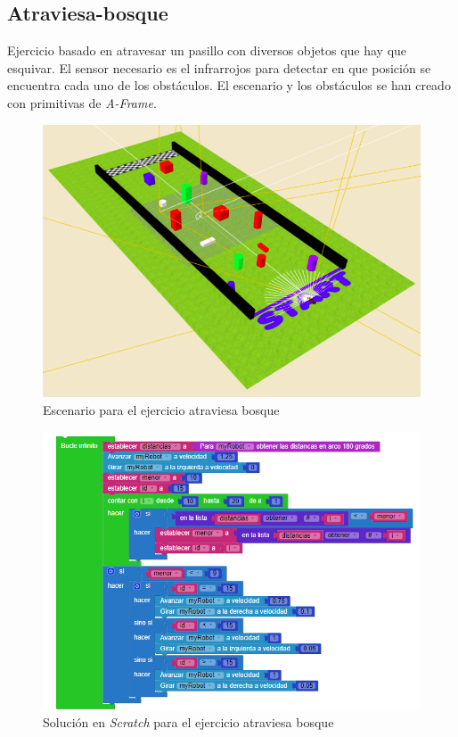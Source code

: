 \subsection{Atraviesa-bosque}
\label{subsec:atraviesabosque}
Ejercicio basado en atravesar un pasillo con diversos objetos que hay que esquivar. El sensor necesario es el infrarrojos para detectar en que posición se encuentra cada uno de los obstáculos. El escenario y los obstáculos se han creado con primitivas de \textit{A-Frame}.

    \begin{figure}[H]
    \centering
    \includegraphics[scale=0.45]{img/atraviesabosque-indiv.png}
    \caption{Escenario para el ejercicio atraviesa bosque} 
    \label{fig:atraviesaBosqueind}
    \end{figure}

    \begin{figure}[H]
    \centering
    \includegraphics[scale=0.6]{img/atraviesaBosqueCodigo.png}
    \caption{Solución en \textit{Scratch} para el ejercicio atraviesa bosque} 
    \label{fig:bosqueSolution}
    \end{figure}
    
